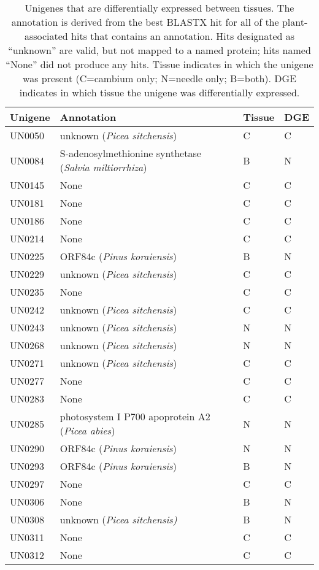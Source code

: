 \begin{longtable}{llll}
\caption{Unigenes that are differentially expressed between tissues. The annotation 
is derived from the best BLASTX hit for all of the plant-associated hits that contains 
an annotation. Hits designated as ``unknown'' are valid, but not mapped to a named 
protein; hits named ``None'' did not produce any hits. Tissue indicates in which the 
unigene was present (C=cambium only; N=needle only; B=both). DGE indicates in 
which tissue the unigene was differentially expressed.}\\
\toprule
Unigene &  Annotation  & Tissue & DGE \\
\midrule
UN0050 &  unknown (\textit{Picea sitchensis}) &  C &  C \\
UN0084 &  S-adenosylmethionine synthetase (\textit{Salvia miltiorrhiza}) &  B &  N \\
UN0145 &  None &  C &  C \\
UN0181 &  None &  C &  C \\
UN0186 &  None &  C &  C \\
UN0214 &  None &  C &  C \\
UN0225 &  ORF84c (\textit{Pinus koraiensis}) &  B &  N \\
UN0229 &  unknown (\textit{Picea sitchensis}) &  C &  C \\
UN0235 &  None &  C &  C \\
UN0242 &  unknown (\textit{Picea sitchensis}) &  C &  C \\
UN0243 &  unknown (\textit{Picea sitchensis}) &  N &  N \\
UN0268 &  unknown (\textit{Picea sitchensis}) &  N &  N \\
UN0271 &  unknown (\textit{Picea sitchensis}) &  C &  C \\
UN0277 &  None &  C &  C \\
UN0283 &  None &  C &  C \\
UN0285 &  photosystem I P700 apoprotein A2 (\textit{Picea abies}) &  N &  N \\
UN0290 &  ORF84c (\textit{Pinus koraiensis}) &  N &  N \\
UN0293 &  ORF84c (\textit{Pinus koraiensis}) &  B &  N \\
UN0297 &  None &  C &  C \\
UN0306 &  None &  B &  N \\
UN0308 &  unknown (\textit{Picea sitchensis)} &  B &  N \\
UN0311 &  None &  C &  C \\
UN0312 &  None &  C &  C \\

\end{longtable}
